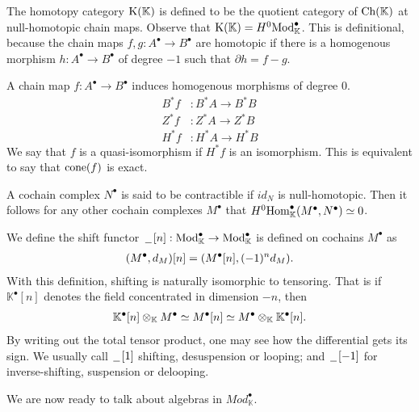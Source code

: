 \documentclass[../thesis.tex]{subfiles}
\begin{document}
            The homotopy category $\tt{K}(\mathbb{K})$ is defined to be the quotient category of $\tt{Ch}(\mathbb{K})$ at null-homotopic chain maps. Observe that $\tt{K}(\mathbb{K}) = H^0\tt{Mod}_\mathbb{K}^\bullet$. This is definitional, because the chain maps $f, g : A^\bullet \rightarrow B^\bullet$ are homotopic if there is a homogenous morphism $h : A^\bullet \rightarrow B^\bullet$ of degree $-1$ such that $\partial h = f - g$.

            A chain map $f : A^\bullet \rightarrow B^\bullet$ induces homogenous morphisms of degree $0$.
            \begin{align*}
                B^*f & : B^*A \rightarrow B^*B \\
                Z^*f & : Z^*A \rightarrow Z^*B \\
                H^*f & : H^*A \rightarrow H^*B
            \end{align*}
            We say that $f$ is a quasi-isomorphism if $H^*f$ is an isomorphism. This is equivalent to say that $\tt{cone}(f)$ is exact.

            A cochain complex $N^\bullet$ is said to be contractible if $id_N$ is null-homotopic. Then it follows for any other cochain complexes $M^\bullet$ that $H^0\tt{Hom}_\mathbb{K}^\bullet(M^\bullet, N^\bullet) \simeq 0$.

            We define the shift functor $\argument [n] : \tt{Mod}_\mathbb{K}^\bullet \rightarrow \tt{Mod}_\mathbb{K}^\bullet$ is defined on cochains $M^\bullet$ as
            \begin{align*}
                (M^\bullet, d_M)[n] = (M^\bullet[n], (-1)^nd_M)\tt{.}
            \end{align*}
            With this definition, shifting is naturally isomorphic to tensoring. That is if $\mathbb{K}^\bullet[n]$ denotes the field concentrated in dimension $-n$, then
            \begin{align*}
                \mathbb{K}^\bullet[n]\otimes_\mathbb{K} M^\bullet \simeq M^\bullet[n]\simeq M^\bullet\otimes_\mathbb{K}\mathbb{K}^\bullet[n]\tt{.}
            \end{align*}
            By writing out the total tensor product, one may see how the differential gets its sign. We usually call $\argument[1]$ shifting, desuspension or looping; and $\argument[-1]$ for inverse-shifting, suspension or delooping.

            We are now ready to talk about algebras in $Mod_\mathbb{K}^\bullet$.
\end{document}
